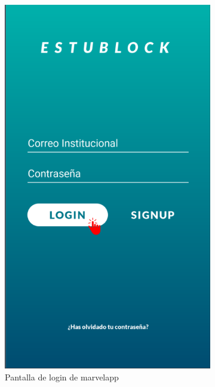 \begin{figure}[hbt]
	\centering
	\begin{subfigure}[b]{0.4\linewidth}
		\centering
        \includegraphics[width=0.7\linewidth]{figs/Desarrollo/Interfaz/marvel_login}
        \caption[Marvel Login]{Pantalla de login de marvelapp}
	\end{subfigure} 
	\begin{subfigure}[b]{0.4\linewidth}
		\centering

\end{subfigure}
\end{figure}
